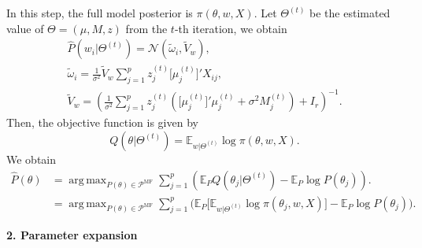 \documentclass[pdftex, noinfoline, letter]{imsart}
\DeclareMathOperator*{\argmax}{arg\,max}
\theoremstyle{plain}
\begin{document}
In this step, the full model posterior is $\pi(\theta, w, X)$. Let $\Theta^{(t)}$ be the estimated value of $\Theta = (\mu, M, z)$ from the $t$-th iteration, we obtain
\begin{eqnarray}
\label{eqn:cavi-w}
    & \widehat  P(w_i|\Theta^{(t)}) = \mathcal{N}(\widetilde  \omega_i, \widetilde  V_w), & \nonumber\\
    & \widetilde  \omega_i = \frac{1}{\sigma^{2}} \widetilde  V_w \sum_{j=1}^p z_j^{(t)} \big[\mu_j^{(t)}\big]' X_{ij}, &  \\
& \widetilde  V_w = 
\left(\frac{1}{\sigma^{2}}
\sum_{j=1}^p z_j^{(t)}
\left(\big[\mu_j^{(t)}\big]' {\mu_j^{(t)}} + \sigma^2M_j^{(t)} \right)
+ I_r
\right)^{-1}. &
\nonumber 
\end{eqnarray}
Then, the objective function is given by 
$$Q(\theta|\Theta^{(t)}) = \mathbb{E}_{w|\Theta^{(t)}}\log  \pi(\theta, w, X).$$
We obtain 
\begin{align*}
\widehat  P(\theta) & = 
\argmax_{P(\theta) \in \mathcal{P}^{\text{MF}}}
\sum_{j=1}^p
\left(
\mathbb{E}_P Q(\theta_j |\Theta^{(t)}) - \mathbb{E}_P \log P(\theta_j)
\right).
\\
& = \argmax_{P(\theta) \in \mathcal{P}^{\text{MF}}}
\sum_{j=1}^p
\Big(
\mathbb{E}_P \big[\mathbb{E}_{w|\Theta^{(t)}} \log \pi(\theta_j, w, X)\big] - \mathbb{E}_P \log P(\theta_j)
\Big).
\end{align*}


{\bf 2. Parameter expansion}
\end{document}
